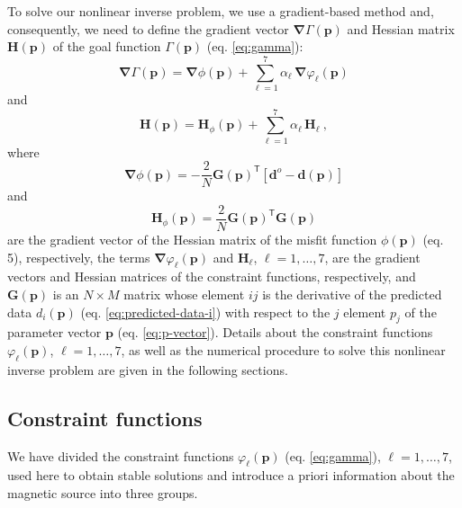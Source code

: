 To solve our nonlinear inverse problem, we use a gradient-based  method and, consequently, we need to define the gradient vector 
$\boldsymbol{\nabla}\Gamma(\mathbf{p})$ and Hessian matrix $\mathbf{H}(\mathbf{p})$ of the goal function 
$\Gamma(\mathbf{p})$ (eq. \ref{eq:gamma}):
\begin{equation}\label{eq:gamma_gradient}
\boldsymbol{\nabla}\Gamma (\mathbf{p}) = \boldsymbol{\nabla}\phi (\mathbf{p}) + 
\sum\limits^{7}_{\ell =1} \alpha_{\ell} \, \boldsymbol{\nabla}\varphi_{\ell}(\mathbf{p})
\end{equation}
and
\begin{equation}\label{eq:gamma_hessian}
\mathbf{H} (\mathbf{p}) = \mathbf{H}_\phi (\mathbf{p}) + \sum\limits^{7}_{\ell =1} \alpha_{\ell} \, \mathbf{H}_\ell \: ,
\end{equation}
where 
\begin{equation}\label{eq:phi_gradient}
\boldsymbol{\nabla} \phi(\mathbf{p}) =  - \frac{2}{N}\mathbf{G}(\mathbf{p})^{\mathsf{T}}[\mathbf{d}^o - \mathbf{d}(\mathbf{p})]
\end{equation} 
and 
\begin{equation}\label{eq:phi_hessian}
\mathbf{H}_{\phi}(\mathbf{p}) = \frac{2}{N}\mathbf{G}(\mathbf{p})^{\mathsf{T}}\mathbf{G}(\mathbf{p})
\end{equation}
are the gradient vector of the Hessian matrix of the misfit function $\phi(\mathbf{p})$ (eq. 5), respectively, the terms 
$\boldsymbol{\nabla} \varphi_{\ell}(\mathbf{p})$ and $\mathbf{H}_{\ell}$, $\ell = 1, \dots, 7$, are the gradient vectors and Hessian 
matrices of the constraint functions, respectively, and $\mathbf{G}(\mathbf{p})$ is an $N \times M$ matrix whose element $ij$ is 
the derivative of the predicted data $d_{i}(\mathbf{p})$ (eq. \ref{eq:predicted-data-i}) with respect to the $j$ element $p_{j}$ of 
the parameter vector $\mathbf{p}$ (eq. \ref{eq:p-vector}).
Details about the constraint functions $\varphi_\ell(\mathbf{p})$, $\ell = 1, \dots, 7$, as well as the numerical procedure to solve 
this nonlinear inverse problem are given in the following sections.


\subsection{Constraint functions}\label{sec:constraints}

We have divided the constraint functions $\varphi_{\ell}(\mathbf{p})$ (eq. \ref{eq:gamma}), $\ell = 1, \dots, 7$, used here to 
obtain stable solutions and introduce a priori information about the magnetic source into three groups.

